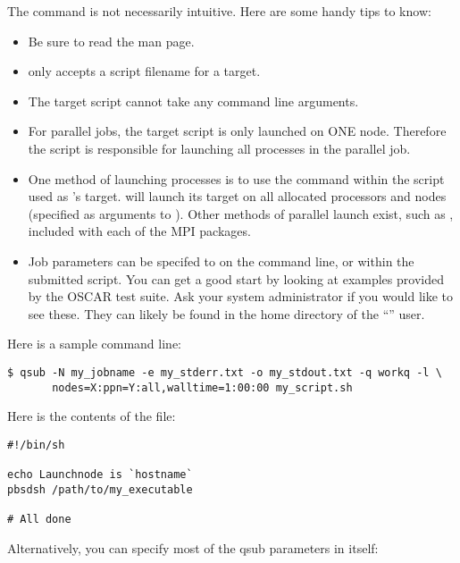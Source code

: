 The  command is not necessarily intuitive.  Here are some
handy tips to know:

\begin{itemize}
\item Be sure to read the  man page.

\item {} only accepts a script filename for a target.

\item The target script cannot take any command line arguments.

\item For parallel jobs, the target script is only launched on ONE
  node.  Therefore the script is responsible for launching all
  processes in the parallel job.

\item One method of launching processes is to use the 
  command within the script used as 's target.
    will launch its target on all allocated processors and nodes
  (specified as arguments to ).  Other methods of parallel
  launch exist, such as , included with each of the MPI packages.

\item Job parameters can be specifed to  on the command
  line, or within the submitted script.  You can get a good start by
  looking at examples provided by the OSCAR test suite.  Ask your
  system administrator if you would like to see these.  They can
  likely be found in the home directory of the ``''
  user.
\end{itemize}

Here is a sample  command line:

\begin{verbatim}
$ qsub -N my_jobname -e my_stderr.txt -o my_stdout.txt -q workq -l \
       nodes=X:ppn=Y:all,walltime=1:00:00 my_script.sh
\end{verbatim}

Here is the contents of the  file:

\begin{verbatim}
#!/bin/sh

echo Launchnode is `hostname`
pbsdsh /path/to/my_executable

# All done
\end{verbatim}

Alternatively, you can specify most of the qsub parameters in
 itself:

